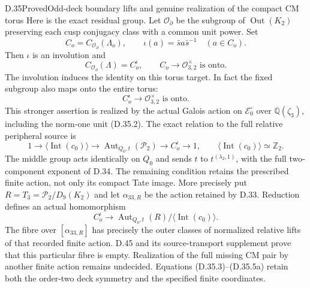 \begin{statement}{D.35}{Proved}{Odd-deck boundary lifts and genuine realization of the compact CM torus}
Here is the exact residual group. Let $\mathcal O_{\partial}$ be
the subgroup of $\operatorname{Out}(K_2)$ preserving each cusp
conjugacy class with a common unit power. Set
\[
 C_o=C_{\mathcal O_{\partial}}(\Lambda_o),\qquad
 \iota(a)=\bar s a\bar s^{-1}\quad(a\in C_o).
                                                               \tag{D.35.3}
\]
Then $\iota$ is an involution and
\[
 C_{\mathcal O_{\partial}}(\Lambda)=C_o^{\iota},
 \qquad C_o\longrightarrow\mathcal O_{3,2}^{\times}
                  \text{ is onto}.                  \tag{D.35.4}
\]
The involution induces the identity on this torus target. In fact the
fixed subgroup also maps onto the entire torus:
\[
 C_o^{\iota}\longrightarrow\mathcal O_{3,2}^{\times}
                  \text{ is onto}.                  \tag{D.35.4a}
\]
This stronger assertion is realized by the actual Galois action on
$\mathcal E_0^\circ$ over $\mathbb Q(\zeta_3)$, including the
norm-one unit (D.35.2). The exact
relation to the full relative peripheral source is
\[
 1\longrightarrow\langle\operatorname{Int}(c_0)\rangle
 \longrightarrow\operatorname{Aut}_{Q_0,t}(\mathcal P_2)
 \longrightarrow C_o^{\iota}\longrightarrow1,
 \qquad\langle\operatorname{Int}(c_0)\rangle\simeq\mathbb Z_2.
                                                               \tag{D.35.5}
\]
The middle group acts identically on $Q_0$ and sends
$t$ to $t^{(\lambda_2,1)}$, with the full two-component exponent
of D.34. The remaining condition retains the prescribed finite action,
not only its compact Tate image. More precisely put
$R=T_3=\mathcal P_2/D_9(K_2)$ and let $\alpha_{33,R}$ be the action
retained by D.33. Reduction defines an actual homomorphism
\[
 C_o^{\iota}\longrightarrow
 \operatorname{Aut}_{Q_0,t}(R)/\langle\operatorname{Int}(c_0)\rangle.
                                                               \tag{D.35.5a}
\]
The fibre over $[\alpha_{33,R}]$ has precisely the outer classes of
normalized relative lifts of that recorded finite action. D.45 and its source-transport supplement prove that this
particular fibre is empty. Realization of the full missing CM pair
by another finite action remains undecided. Equations (D.35.3)--(D.35.5a) retain both the order-two
deck symmetry and the specified finite coordinates.
\end{statement}
